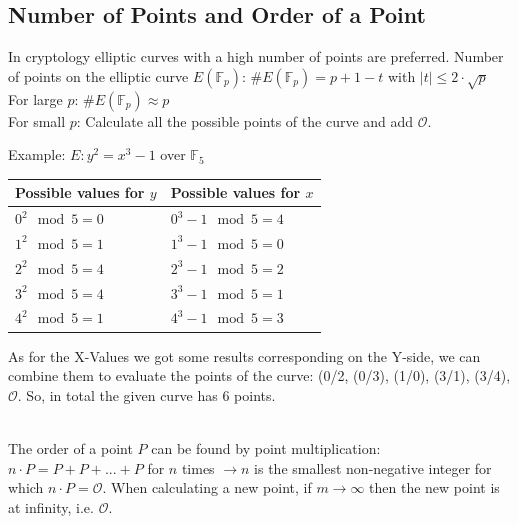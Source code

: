 \subsection{Number of Points and Order of a Point}
In cryptology elliptic curves with a high number of points are preferred.
Number of points on the elliptic curve $E(\mathbb{F}_p)$: $\#E(\mathbb{F}_p)=p+1-t$ with $|t| \leq 2 \cdot \sqrt{p}$ \\
For large $p$:  $\#E(\mathbb{F}_p) \approx p $ \\
For small $p$:  Calculate all the possible points of the curve and add $\mathcal{O}$.\\
\begin{minipage}{8cm}
	Example: $E: y^2=x^3-1$ over $\mathbb{F}_5$\\
	\begin{tabular}{|l |l|}
		\hline
		Possible values for $y$	&	Possible values for $x$\\
		\hline
		$0^2 \mod 5 = 0$		&	$0^3 - 1 \mod 5 = 4$\\
		\hline
		$1^2 \mod 5 = 1$		&	$1^3 - 1 \mod 5 = 0$\\
		\hline
		$2^2 \mod 5 = 4$		&	$2^3 - 1 \mod 5 = 2$\\
		\hline
		$3^2 \mod 5 = 4$		&	$3^3 - 1 \mod 5 = 1$\\
		\hline
		$4^2 \mod 5 = 1$		&	$4^3 - 1 \mod 5 = 3$\\
		\hline
	\end{tabular}
\end{minipage}
\begin{minipage}{10cm}
	As for the X-Values we got some results corresponding on the Y-side, we can combine them to evaluate the points of the curve: (0/2, (0/3), (1/0), (3/1), (3/4), $\mathcal{O}$.
	So, in total the given curve has 6 points.\\
\end{minipage}\\

The order of a point $P$ can be found by point multiplication: $n \cdot P=P+P+...+P$ for $n$ times $\to n$ is the smallest non-negative integer for which $n \cdot P=\mathcal{O}$. 
When calculating a new point, if $m\to \infty$ then the new point is at infinity, i.e. $\mathcal{O}$.\\

